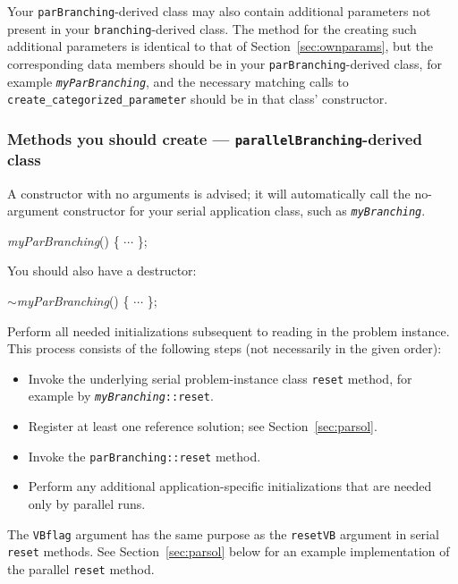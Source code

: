 Your \texttt{parBranching}-derived class may also contain additional
parameters not present in your \texttt{branching}-derived class.  The
method for the creating such additional parameters is identical to
that of
Section~\ref{sec:ownparams}, but the corresponding data members should
be in
your \texttt{parBranching}-derived class, for example
\texttt{\emph{myParBranching}}, and the necessary matching calls to
\texttt{create\_categorized\_parameter} should be in that class'
constructor. 


\subsubsection{Methods you should create ---
  \texttt{parallelBranching}-derived class}
A constructor with no arguments is advised; it will automatically call
the no-argument constructor for your serial application class, such as
\texttt{\emph{myBranching}}. 
\begin{codeblock}
\emph{myParBranching}() \{ $\cdots$ \}; \\
\end{codeblock}

You should also have a destructor:
\begin{codeblock}
$\sim$\emph{myParBranching}() \{ $\cdots$ \}; \\
\end{codeblock}

Perform all needed initializations subsequent to reading in the
problem instance.  This process consists of the following steps (not
necessarily in the given order):
\begin{itemize}
\item Invoke the underlying serial problem-instance class
  \texttt{reset} method, for example by
  \texttt{\emph{myBranching}::reset}.
\item Register at least one reference solution; see
  Section~\ref{sec:parsol}.
\item Invoke the \texttt{parBranching::reset} method.
\item Perform any additional application-specific initializations that
  are needed only by parallel runs.
\end{itemize}
The \texttt{VBflag} argument has the same purpose as the
\texttt{resetVB} argument in serial \texttt{reset} methods.  See
Section~\ref{sec:parsol} below for an example implementation of the
parallel \texttt{reset} method.

